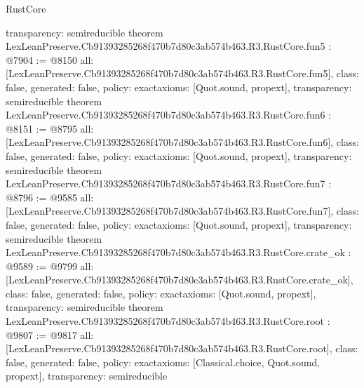 \begin{lexlean}{RustCore}
\begin{coremodule}
{  transparency: semireducible
}
theorem LexLeanPreserve.Cb91393285268f470b7d80c3ab574b463.R3.RustCore.fun5 : @7904 := @8150 {
  all: [LexLeanPreserve.Cb91393285268f470b7d80c3ab574b463.R3.RustCore.fun5],
  class: false,
  generated: false,
  policy: exact{axioms: [Quot.sound, propext]},
  transparency: semireducible
}
theorem LexLeanPreserve.Cb91393285268f470b7d80c3ab574b463.R3.RustCore.fun6 : @8151 := @8795 {
  all: [LexLeanPreserve.Cb91393285268f470b7d80c3ab574b463.R3.RustCore.fun6],
  class: false,
  generated: false,
  policy: exact{axioms: [Quot.sound, propext]},
  transparency: semireducible
}
theorem LexLeanPreserve.Cb91393285268f470b7d80c3ab574b463.R3.RustCore.fun7 : @8796 := @9585 {
  all: [LexLeanPreserve.Cb91393285268f470b7d80c3ab574b463.R3.RustCore.fun7],
  class: false,
  generated: false,
  policy: exact{axioms: [Quot.sound, propext]},
  transparency: semireducible
}
theorem LexLeanPreserve.Cb91393285268f470b7d80c3ab574b463.R3.RustCore.crate_ok : @9589 := @9799 {
  all: [LexLeanPreserve.Cb91393285268f470b7d80c3ab574b463.R3.RustCore.crate_ok],
  class: false,
  generated: false,
  policy: exact{axioms: [Quot.sound, propext]},
  transparency: semireducible
}
theorem LexLeanPreserve.Cb91393285268f470b7d80c3ab574b463.R3.RustCore.root : @9807 := @9817 {
  all: [LexLeanPreserve.Cb91393285268f470b7d80c3ab574b463.R3.RustCore.root],
  class: false,
  generated: false,
  policy: exact{axioms: [Classical.choice, Quot.sound, propext]},
  transparency: semireducible
}


\end{coremodule}
\end{lexlean}
